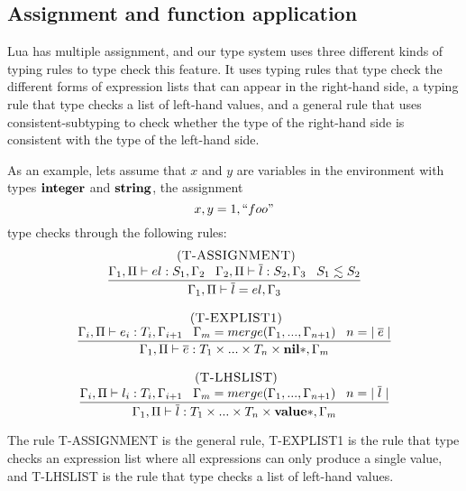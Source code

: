 \subsection{Assignment and function application}
\label{sec:assignment}

Lua has multiple assignment, and our type system uses three
different kinds of typing rules to type check this feature.
It uses typing rules that type check the different forms
of expression lists that can appear in the right-hand side,
a typing rule that type checks a list of left-hand values,
and a general rule that uses consistent-subtyping to check
whether the type of the right-hand side is consistent with
the type of the left-hand side.

As an example, lets assume that $x$ and $y$ are variables in the
environment with types $\mathbf{integer}$ and $\mathbf{string}$, the assignment
\[
x, y = 1, ``foo"
\]
type checks through the following rules:
\[
\begin{array}{c}
\begin{array}{c}
\; (\textsc{T-ASSIGNMENT})\\
\dfrac{\Gamma_{1}, \Pi \vdash el:S_{1}, \Gamma_{2} \;\;\;
       \Gamma_{2}, \Pi \vdash \overline{l}:S_{2}, \Gamma_{3} \;\;\;
       S_{1} \lesssim S_{2}}
      {\Gamma_{1}, \Pi \vdash \overline{l} = el,\Gamma_{3}}
\end{array}
\\ \\
\begin{array}{c}
\; (\textsc{T-EXPLIST1})\\
\dfrac{\Gamma_{i}, \Pi \vdash e_{i}:T_{i}, \Gamma_{i+1} \;\;\;
       \Gamma_{m} = merge(\Gamma_{1}, ..., \Gamma_{n+1}) \;\;\;
       n = |\;\overline{e}\;|}
      {\Gamma_{1}, \Pi \vdash \overline{e}:T_{1} \times ... \times T_{n} \times \mathbf{nil}{*}, \Gamma_{m}}
\end{array}
\\ \\
\begin{array}{c}
\; (\textsc{T-LHSLIST})\\
\dfrac{\Gamma_{i}, \Pi \vdash l_{i}:T_{i}, \Gamma_{i+1} \;\;\;
       \Gamma_{m} = merge(\Gamma_{1}, ..., \Gamma_{n+1}) \;\;\;
       n = |\;\overline{l}\;|}
      {\Gamma_{1}, \Pi \vdash \overline{l}:T_{1} \times ... \times T_{n} \times \mathbf{value}{*}, \Gamma_{m}}
\end{array}
\end{array}
\]

The rule \textsc{T-ASSIGNMENT} is the general rule,
\textsc{T-EXPLIST1} is the rule that type checks an expression list
where all expressions can only produce a single value, and
\textsc{T-LHSLIST} is the rule that type checks a list of left-hand values.

